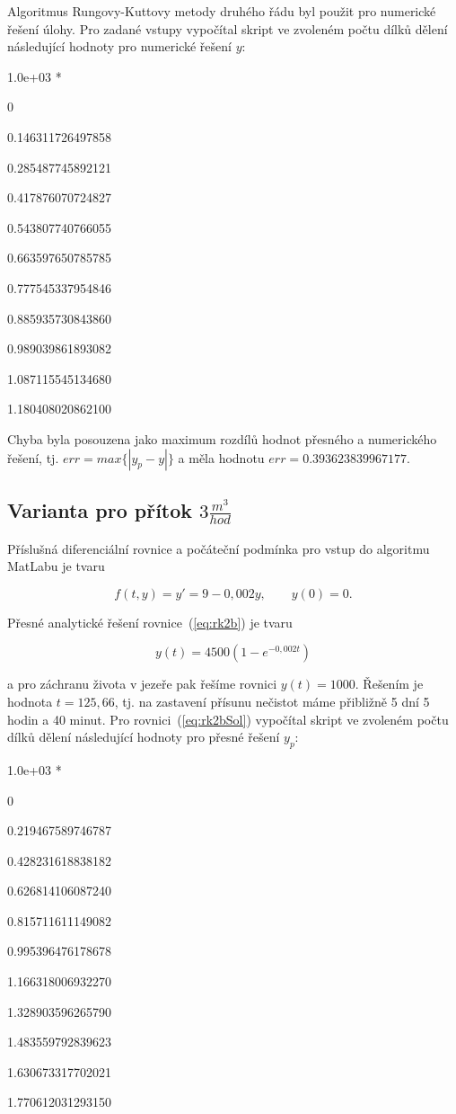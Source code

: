 \documentclass[a4paper,12pt]{article}
\begin{document}
Algoritmus Rungovy-Kuttovy metody druhého řádu byl použit pro numerické řešení úlohy. Pro zadané vstupy vypočítal skript ve zvoleném počtu dílků dělení následující hodnoty pro numerické řešení $y$:\bigskip\bigskip\bigskip\bigskip\bigskip

 1.0e+03 *\par

                   0\par
   0.146311726497858\par
   0.285487745892121\par
   0.417876070724827\par
   0.543807740766055\par
   0.663597650785785\par
   0.777545337954846\par
   0.885935730843860\par
   0.989039861893082\par
   1.087115545134680\par
   1.180408020862100\bigskip
   
   
Chyba byla posouzena jako maximum rozdílů hodnot přesného a numerického řešení, tj. $err=max\{\left|y_p-y\right|\}$ a měla hodnotu $err=0.393623839967177$.

\subsection{Varianta pro přítok $3\frac{m^3}{hod}$}
Příslušná diferenciální rovnice a počáteční podmínka pro vstup do algoritmu MatLabu je tvaru

\begin{equation}
f(t,y) = y'=9-0,002y,\qquad y(0)=0.
\label{eq:rk2b}
\end{equation}

Přesné analytické řešení rovnice~(\ref{eq:rk2b}) je tvaru

\begin{equation}
y(t) = 4500(1-e^{-0,002t})
\label{eq:rk2bSol}
\end{equation}

a pro záchranu života v jezeře pak řešíme rovnici $y(t)=1000$. Řešením je hodnota $t=125,66$, tj. na zastavení přísunu nečistot máme přibližně 5 dní 5 hodin a 40 minut. Pro rovnici~(\ref{eq:rk2bSol}) vypočítal skript ve zvoleném počtu dílků dělení následující hodnoty pro přesné řešení $y_p$:\bigskip 

   1.0e+03 *\par

                   0\par
   0.219467589746787\par
   0.428231618838182\par
   0.626814106087240\par
   0.815711611149082\par
   0.995396476178678\par
   1.166318006932270\par
   1.328903596265790\par
   1.483559792839623\par
   1.630673317702021\par
   1.770612031293150\bigskip
   
\end{document}
